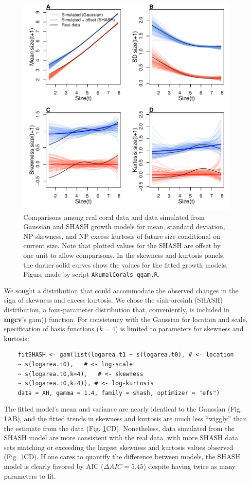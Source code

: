 \documentclass[12pt]{article}
\begin{document}
\begin{figure}[tbp]
	\centering
	\includegraphics[width=1.0\textwidth]{figures/coral_SHASH_fit.pdf}
	\caption{Comparisons among real coral data and data simulated from Gaussian and SHASH growth models for mean, 
	standard deviation, NP skewness, and NP excess kurtosis of future size conditional on current size. Note that plotted values for the SHASH are offset by one unit to allow comparisons. 
	In the skewness and kurtosis panels, the darker solid curves show the values for the fitted growth models. 
	Figure made by script \texttt{AkumalCorals\_qgam.R}.}
	\label{fig:coral_fit}
\end{figure} 

We sought a distribution that could accommodate the observed changes in the sign of skewness and excess kurtosis. We chose the sinh-arcsinh (SHASH) distribution, a four-parameter distribution that, 
conveniently, is included in \textbf{mgcv}'s gam() function. 
For consistency with the Gaussian for location and scale, specification of basis functions ($k=4$) is limited to parameters for skewness and kurtosis:
\begin{lstlisting}
	fitSHASH <- gam(list(logarea.t1 ~ s(logarea.t0), # <- location 
	~ s(logarea.t0),   # <- log-scale
	~ s(logarea.t0,k=4),   # <- skewness
	~ s(logarea.t0,k=4)), # <- log-kurtosis
	data = XH, gamma = 1.4, family = shash, optimizer = "efs")
\end{lstlisting}
The fitted model's mean and variance are nearly identical to the Gaussian (Fig. \ref{fig:coral_fit}AB), and the fitted trends in skewness and kurtosis are much less ``wiggly'' than the estimate from the data (Fig. \ref{fig:coral_fit}CD). 
Nonetheless, data simulated from the SHASH model are more consistent with the real data, with more SHASH data sets matching or exceeding the largest skewness and kurtosis values observed (Fig. \ref{fig:coral_fit}CD). 
If one cares to quantify the difference between models, the SHASH model is clearly favored by AIC ($\Delta AIC = 5.45$) despite having twice as many parameters to fit. 
 
\end{document}
